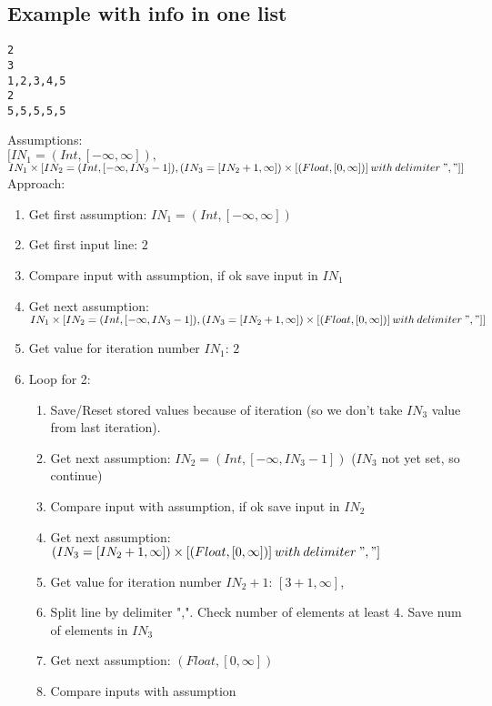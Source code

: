\documentclass[11pt]{article}
\begin{document}
\subsection{Example with info in one list}

\begin{lstlisting}[numbers=none]
2
3
1,2,3,4,5
2
5,5,5,5,5
\end{lstlisting}

Assumptions:\\
$[IN_1 = (Int, [-\infty, \infty]),$\\
$IN_1 \times [IN_2 = (Int, [-\infty, IN_3-1]), (IN_3 = [IN_2+1, \infty]) \times [(Float, [0, \infty])]\:with\:delimiter\:","]]$\\

Approach:
\begin{enumerate}
  \item Get first assumption: $IN_1 = (Int, [-\infty, \infty])$
  \item Get first input line: $2$
  \item Compare input with assumption, if ok save input in $IN_1$
  \item Get next assumption: $IN_1 \times [IN_2 = (Int, [-\infty, IN_3-1]), (IN_3 = [IN_2+1, \infty]) \times [(Float, [0, \infty])] \:with\:delimiter\:","]]$
  \item Get value for iteration number $IN_1$: $2$
  \item Loop for 2:
  \begin{enumerate}
    \item Save/Reset stored values because of iteration (so we don't take $IN_3$ value from last iteration).
    \item Get next assumption: $IN_2 = (Int, [-\infty, IN_3-1])$ ($IN_3$ not yet set, so continue)
    \item Compare input with assumption, if ok save input in $IN_2$
    \item Get next assumption: $(IN_3 = [IN_2+1, \infty]) \times [(Float, [0, \infty])] \:with\:delimiter\:","]$
    \item Get value for iteration number $IN_2+1$: $[3+1, \infty]$,
    \item Split line by delimiter ",". Check number of elements at least $4$. Save num of elements in $IN_3$
    \item Get next assumption: $(Float, [0, \infty])$
    \item Compare inputs with assumption
  \end{enumerate}
\end{enumerate}
\end{document}

